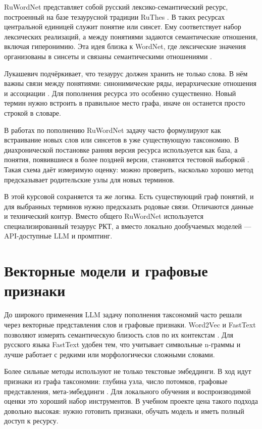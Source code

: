 \documentclass[12pt,a4paper,oneside,openany]{report}
\begin{document}
RuWordNet представляет собой русский лексико-семантический ресурс, построенный на базе тезаурусной традиции RuThes \cite{loukachevitch2002,ruwordnet}. В таких ресурсах центральной единицей служит понятие или синсет. Ему соответствует набор лексических реализаций, а между понятиями задаются семантические отношения, включая гиперонимию. Эта идея близка к WordNet, где лексические значения организованы в синсеты и связаны семантическими отношениями \cite{miller1990}.

Лукашевич подчёркивает, что тезаурус должен хранить не только слова. В нём важны связи между понятиями: синонимические ряды, иерархические отношения и ассоциации \cite{louk2010}. Для пополнения ресурса это особенно существенно. Новый термин нужно встроить в правильное место графа, иначе он останется просто строкой в словаре.

В работах по пополнению RuWordNet задачу часто формулируют как встраивание новых слов или синсетов в уже существующую таксономию. В диахронической постановке ранняя версия ресурса используется как база, а понятия, появившиеся в более поздней версии, становятся тестовой выборкой \cite{nikishina2020,nikishina2022}. Такая схема даёт измеримую оценку: можно проверить, насколько хорошо метод предсказывает родительские узлы для новых терминов.

В этой курсовой сохраняется та же логика. Есть существующий граф понятий, и для выбранных терминов нужно предсказать родовые связи. Отличаются данные и технический контур. Вместо общего RuWordNet используется специализированный тезаурус РКТ, а вместо локально дообучаемых моделей — API-доступные LLM и промптинг.

\section{Векторные модели и графовые признаки}

До широкого применения LLM задачу пополнения таксономий часто решали через векторные представления слов и графовые признаки. Word2Vec и FastText позволяют измерять семантическую близость слов по их контекстам \cite{mikolov2013,bojanowski2017}. Для русского языка FastText удобен тем, что учитывает символьные n-граммы и лучше работает с редкими или морфологически сложными словами.

Более сильные методы используют не только текстовые эмбеддинги. В ход идут признаки из графа таксономии: глубина узла, число потомков, графовые представления, мета-эмбеддинги \cite{nikishina2022}. Для локального обучения и воспроизводимой оценки это хороший набор инструментов. В учебном проекте цена такого подхода довольно высокая: нужно готовить признаки, обучать модель и иметь полный доступ к ресурсу.
\end{document}
